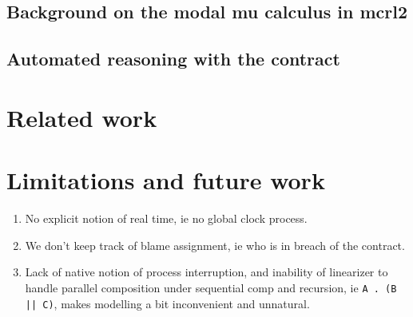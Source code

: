 \documentclass{article}
\begin{document}
\subsection{Background on the modal mu calculus in mcrl2}

\subsection{Automated reasoning with the contract}

\section{Related work}

\section{Limitations and future work}

\begin{enumerate}
  \item No explicit notion of real time, ie no global clock process.

  \item We don't keep track of blame assignment, ie who is in breach of the
  contract.

  \item Lack of native notion of process interruption, and inability of
  linearizer to handle parallel composition under sequential comp and recursion,
  ie \texttt{A . (B || C)}, makes modelling a bit inconvenient and unnatural.
\end{enumerate}






\newpage



\end{document}
